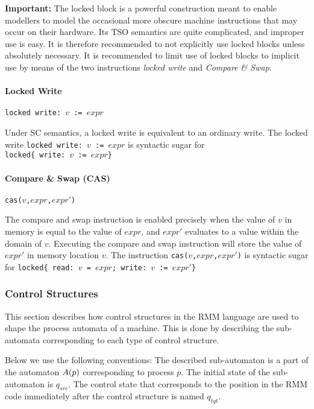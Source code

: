 \documentclass[a4paper]{article}
\begin{document}
{\bf Important:} The locked block is a powerful construction meant to
enable modellers to model the occasional more obscure machine
instructions that may occur on their hardware. Its TSO semantics are
quite complicated, and improper use is easy. It is therefore
recommended to not explicitly use locked blocks unless absolutely
necessary. It is recommended to limit use of locked blocks to implicit
use by means of the two instructions \emph{locked write} and
\emph{Compare \& Swap}.

\paragraph{Locked Write} \verb+locked write: +$v$\verb+ := +$expr$

Under SC semantics, a locked write is equivalent to an ordinary
write. The locked write \verb+locked write: +$v$\verb+ := +$expr$ is
syntactic sugar for \\\verb+locked{ write: +$v$\verb+ := +$expr$\verb+}+

\paragraph{Compare \& Swap (CAS)} \verb+cas(+$v$\verb+,+$expr$\verb+,+$expr'$\verb+)+

The compare and swap instruction is enabled precisely when the value
of $v$ in memory is equal to the value of $expr$, and $expr'$ evaluates
to a value within the domain of $v$. Executing the compare and swap
instruction will store the value of $expr'$ in memory location
$v$. The instruction
\verb+cas(+$v$\verb+,+$expr$\verb+,+$expr'$\verb+)+ is syntactic sugar
for
\verb+locked{ read: +$v$\verb+ = +$expr$\verb+; write: +$v$\verb+ := +$expr'$\verb+}+

\subsubsection{Control Structures}

\newcommand{\tikzq}[3]{\node (#1) at (#2) [circle,draw=black,inner sep=0pt,minimum size=25pt] {$#3$}}

This section describes how control structures in the RMM language are
used to shape the process automata of a machine. This is done by
describing the sub-automata corresponding to each type of control
structure.

Below we use the following conventions: The described sub-automaton is
a part of the automaton $A(p)$ corresponding to process
$p$. The initial state of the sub-automaton is $q_{src}$. The control
state that corresponds to the position in the RMM code immediately
after the control structure is named $q_{tgt}$.
\end{document}
